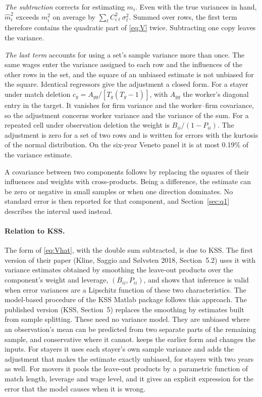 \emph{The subtraction} corrects for estimating $m_i$. Even with the true variances in
hand, $\hat m_i^2$ exceeds $m_i^2$ on average by $\sum_\ell C_{i\ell}^2\sigma_\ell^2$.
Summed over rows, the first term therefore contains the quadratic part of
\eqref{eq:V} twice. Subtracting one copy leaves the variance.

\emph{The last term} accounts for using a set's sample variance more than once. The
same wages enter the variance assigned to each row and the influences of the other
rows in the set, and the square of an unbiased estimate is not unbiased for the
square. Identical regressors give the adjustment a closed form. For a stayer under
match deletion $c_g=A_{gg}/[T_g(T_g-1)]$, with $A_{gg}$ the worker's diagonal entry in
the target. It vanishes for firm variance and the worker--firm covariance, so the
adjustment concerns worker variance and the variance of the sum. For a repeated cell
under observation deletion the weight is $B_{ii}/(1-P_{ii})$. The adjustment is zero
for a set of two rows and is written for errors with the kurtosis of the normal
distribution. On the six-year Veneto panel it is at most 0.19\% of the variance
estimate.

A covariance between two components follows by replacing the squares of their
influences and weights with cross-products. Being a difference, the estimate can be
zero or negative in small samples or when one direction dominates. No standard error
is then reported for that component, and Section~\ref{sec:q1} describes the interval
used instead.

\paragraph{Relation to KSS.}
The form of \eqref{eq:Vhat}, with the double sum subtracted, is due to KSS. The first
version of their paper (Kline, Saggio and S{\o}lvsten 2018, Section~5.2) uses it with
variance estimates obtained by smoothing the leave-out products over the component's
weight and leverage, $(B_{ii},P_{ii})$, and shows that inference is valid when error
variances are a Lipschitz function of these two characteristics. The model-based procedure of the KSS
Matlab package follows this approach. The published version (KSS, Section~5) replaces
the smoothing by estimates built from sample splitting. These need no variance model.
They are unbiased where an observation's mean can be predicted from two separate parts
of the remaining sample, and conservative where it cannot. \fevc{} keeps the earlier
form and changes the inputs. For stayers it uses each stayer's own sample variance and
adds the adjustment that makes the estimate exactly unbiased, for stayers with two
years as well. For movers it pools the leave-out products by a parametric function of
match length, leverage and wage level, and it gives an explicit expression for the
error that the model causes when it is wrong.

